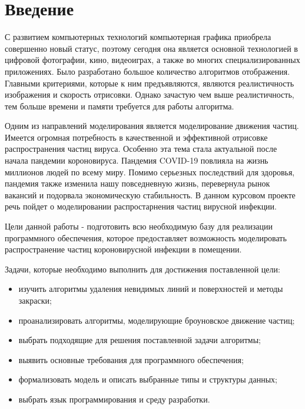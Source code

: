 \chapter*{Введение}

 С развитием компьютерных технологий компьютерная графика приобрела совершенно новый статус, поэтому сегодня она является основной технологией в цифровой фотографии, кино, видеоиграх, а также во многих специализированных приложениях. Было разработано большое количество алгоритмов отображения. Главными критериями, которые к ним предъявляются, являются реалистичность изображения и скорость отрисовки. Однако зачастую чем выше реалистичность, тем больше времени и памяти требуется для работы алгоритма.

Одним из направлений моделирования является моделирование движения частиц. Имеется огромная потребность в качественной и эффективной отрисовке распространения частиц вируса. Особенно эта тема стала актуальной после начала пандемии короновируса. Пандемия COVID-19 повлияла на жизнь миллионов людей по всему миру. Помимо серьезных последствий для здоровья, пандемия также изменила нашу повседневную жизнь, перевернула рынок вакансий и подорвала экономическую стабильность. В данном курсовом проекте речь пойдет о моделировании распростарнения частиц вирусной инфекции.

Цели данной работы - подготовить всю необходимую базу для реализации программного обеспечения, которое предоставляет возможность моделировать распространение частиц короновирусной инфекции в помещении.

Задачи, которые необходимо выполнить для достижения поставленной цели:
\begin{itemize}
	\item изучить алгоритмы удаления невидимых линий и поверхностей и методы закраски;
	\item проанализировать алгоритмы, моделирующие броуновское движение частиц;
	\item выбрать подходящие для решения поставленной задачи алгоритмы;
	\item выявить основные требования для программного обеспечения;
	\item формализовать модель и описать выбранные типы и структуры данных;
	\item выбрать язык программирования и среду разработки.
\end{itemize}
